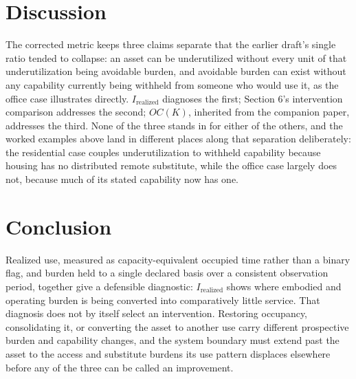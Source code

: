 \documentclass[11pt]{article}
\begin{document}
\section{Discussion}

The corrected metric keeps three claims separate that the earlier draft's single ratio tended to collapse: an asset can be underutilized without every unit of that underutilization being avoidable burden, and avoidable burden can exist without any capability currently being withheld from someone who would use it, as the office case illustrates directly. $I_{\text{realized}}$ diagnoses the first; Section 6's intervention comparison addresses the second; $OC(K)$, inherited from the companion paper, addresses the third. None of the three stands in for either of the others, and the worked examples above land in different places along that separation deliberately: the residential case couples underutilization to withheld capability because housing has no distributed remote substitute, while the office case largely does not, because much of its stated capability now has one.

\section{Conclusion}

Realized use, measured as capacity-equivalent occupied time rather than a binary flag, and burden held to a single declared basis over a consistent observation period, together give a defensible diagnostic: $I_{\text{realized}}$ shows where embodied and operating burden is being converted into comparatively little service. That diagnosis does not by itself select an intervention. Restoring occupancy, consolidating it, or converting the asset to another use carry different prospective burden and capability changes, and the system boundary must extend past the asset to the access and substitute burdens its use pattern displaces elsewhere before any of the three can be called an improvement.
\end{document}
